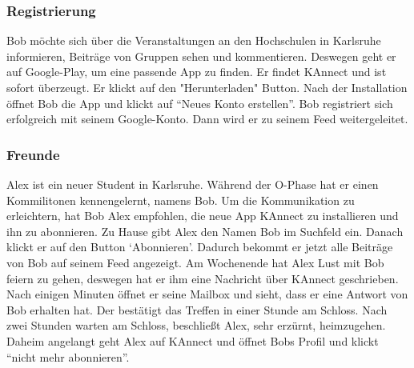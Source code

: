 \documentclass[parskip=full]{scrartcl}
\begin{document}
	\subsubsection{Registrierung}
	Bob möchte sich über die Veranstaltungen an den Hochschulen in Karlsruhe informieren, Beiträge von Gruppen sehen und kommentieren. Deswegen geht er auf Google-Play, um eine passende App zu finden. Er findet KAnnect und ist sofort überzeugt. Er klickt auf den "Herunterladen" Button. Nach der Installation öffnet Bob die App und klickt auf “Neues Konto erstellen”. Bob registriert sich erfolgreich mit seinem Google-Konto. Dann wird er zu seinem Feed weitergeleitet.

	\subsubsection{Freunde}
	Alex ist ein neuer Student in Karlsruhe.  Während der O-Phase hat er einen Kommilitonen kennengelernt, namens Bob. Um die Kommunikation zu erleichtern, hat Bob Alex empfohlen, die neue App  KAnnect zu installieren und ihn zu abonnieren. Zu Hause gibt Alex den Namen Bob im Suchfeld ein. Danach klickt er auf den Button ‘Abonnieren’. Dadurch bekommt er jetzt alle Beiträge von Bob auf seinem Feed angezeigt. Am Wochenende hat Alex Lust mit Bob feiern zu gehen, deswegen hat er ihm eine Nachricht über KAnnect geschrieben. Nach einigen Minuten öffnet er seine Mailbox und sieht, dass er eine Antwort von Bob erhalten hat. Der bestätigt das Treffen in einer Stunde am Schloss. Nach zwei Stunden warten am Schloss, beschließt Alex, sehr erzürnt, heimzugehen. Daheim angelangt geht Alex auf KAnnect und öffnet Bobs Profil und klickt “nicht mehr abonnieren”.
\end{document}
